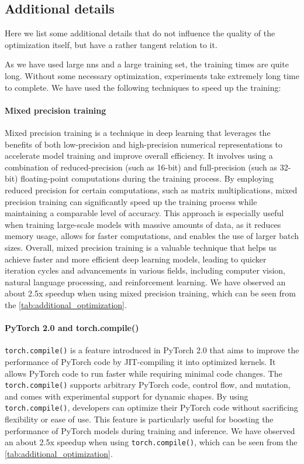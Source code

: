 \subsection{Additional details}

Here we list some additional details that do not influence the quality of the optimization itself, but have a rather
tangent relation to it.

As we have used large \glspl{nn} and a large training set, the training times are quite long. Without some necessary
optimization, experiments take extremely long time to complete. We have used the following techniques to speed up the
training:

\paragraph{Mixed precision training}

Mixed precision training is a technique in deep learning that leverages the benefits of both low-precision and
high-precision numerical representations to accelerate model training and improve overall efficiency. It involves using
a combination of reduced-precision (such as 16-bit) and full-precision (such as 32-bit) floating-point computations
during the training process. By employing reduced precision for certain computations, such as matrix multiplications,
mixed precision training can significantly speed up the training process while maintaining a comparable level of
accuracy. This approach is especially useful when training large-scale models with massive amounts of data, as it
reduces memory usage, allows for faster computations, and enables the use of larger batch sizes. Overall, mixed
precision training is a valuable technique that helps us achieve faster and more efficient deep learning models, leading
to quicker iteration cycles and advancements in various fields, including computer vision, natural language processing,
and reinforcement learning. We have observed an about 2.5x speedup when using mixed precision training, which can be
seen from the \autoref{tab:additional_optimization}.

\paragraph{PyTorch 2.0 and torch.compile()}

\verb|torch.compile()| is a feature introduced in PyTorch 2.0 \cite{pytorch} that aims to improve the performance of
PyTorch code by JIT-compiling it into optimized kernels. It allows PyTorch code to run faster while requiring minimal
code changes. The \verb|torch.compile()| supports arbitrary PyTorch code, control flow, and mutation, and comes with
experimental support for dynamic shapes. By using \verb|torch.compile()|, developers can optimize their PyTorch code
without sacrificing flexibility or ease of use.  This feature is particularly useful for boosting the performance of
PyTorch models during training and inference. We have observed an about 2.5x speedup when using \verb|torch.compile()|,
which can be seen from the \autoref{tab:additional_optimization}.

